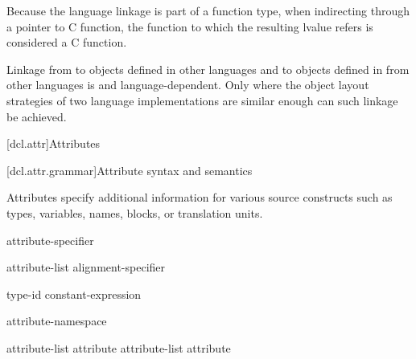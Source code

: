 \pnum
\begin{note}
Because the language linkage is part of a function type, when
indirecting through a pointer to C function, the function to
which the resulting lvalue refers is considered a C function.
\end{note}

\pnum
{}%
%
Linkage from \Cpp{} to objects defined in other languages and to objects
defined in \Cpp{} from other languages is  and
language-dependent. Only where the object layout strategies of two
language implementations are similar enough can such linkage be
achieved.%

[dcl.attr]{Attributes}%

[dcl.attr.grammar]{Attribute syntax and semantics}

\pnum
{}%
Attributes specify additional information for various source constructs
such as types, variables, names, blocks, or translation units.

\begin{bnf}
\br
   attribute-specifier
\end{bnf}

\begin{bnf}
\br
  \terminal{[} \terminal{[}  attribute-list \terminal{]} \terminal{]}\br
  alignment-specifier
\end{bnf}

\begin{bnf}
\br
   type-id  \terminal{)}\br
   constant-expression  \terminal{)}
\end{bnf}

\begin{bnf}
\br
   attribute-namespace \terminal{:}
\end{bnf}

\begin{bnf}
\br
  \br
  attribute-list \terminal{,} \br
  attribute \br
  attribute-list \terminal{,} attribute 
\end{bnf}

